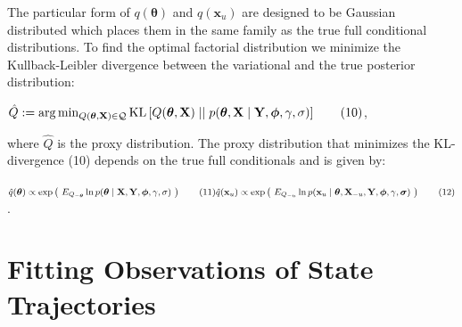 \begin{par}
The particular form of $q(\boldsymbol{\theta})$ and $q(\mathbf{x}_u)$ are designed to be Gaussian distributed which places them in the same family as the true full conditional distributions. To find the optimal factorial distribution we minimize the Kullback-Leibler divergence between the variational and the true posterior distribution:
\end{par} \vspace{1em}
\begin{par}
$\hat{Q} := \mathrm{arg} \min_{Q(\boldsymbol{\theta},\mathbf{X}) \in \mathcal{Q}} \mathrm{KL}\left[ Q(\boldsymbol{\theta},\mathbf{X}) \mid \mid p(\boldsymbol{\theta},\mathbf{X} \mid\mathbf{Y},\boldsymbol{\phi}, \gamma,\mathbf\mathbf{\sigma}) \right] \qquad (10)$,
\end{par} \vspace{1em}
\begin{par}
where $\hat{Q}$ is the proxy distribution. The proxy distribution that minimizes the KL-divergence (10) depends on the true full conditionals and is given by:
\end{par} \vspace{1em}
\begin{par}
$\hat{q}({\boldsymbol{\theta}}) \propto \exp \left(~ E_{Q_{-\boldsymbol{\theta}}} \ln p(\boldsymbol{\theta} \mid\mathbf{X},\mathbf{Y},\boldsymbol{\phi},\gamma,\mathbf\mathbf{\sigma}) ~\right) \qquad (11)\\\hat{q}(\mathbf{x}_u) \propto \exp\left( ~ E_{Q_{-u}} \ln p(\mathbf{x}_u\mid \boldsymbol{\theta}, \mathbf{X}_{-u},\mathbf{Y},\boldsymbol{\phi},\gamma,\boldsymbol{\sigma}) ~ \right)\qquad (12)$.
\end{par}

\section{Fitting Observations of State Trajectories}

